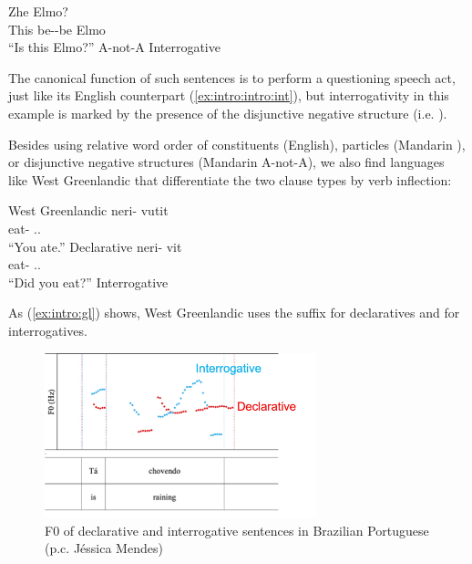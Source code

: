 \gll Zhe  Elmo?\\
This be-\Neg-be Elmo\\
``Is this Elmo?'' \hfill A-not-A Interrogative
\eex

The canonical function of such sentences is to perform a questioning speech act, just like its English counterpart (\ref{ex:intro:intro:int}), but interrogativity in this example is marked by the presence of the disjunctive negative structure (i.e. ). 

Besides using relative word order of constituents (English), particles (Mandarin ), or disjunctive negative structures (Mandarin A-not-A), we also find languages like West Greenlandic that differentiate the two clause types by verb inflection:

West Greenlandic
\bxl
\label{ex:intro:gl:dec}
\gll neri- vutit\\
eat- \Ind.\Ssg.\Pst{}\\
``You ate.'' \hfill Declarative
\ex \label{ex:intro:gl:int}
\gll neri- vit\\
eat- \Int.\Ssg.\Pst{}\\
``Did you eat?'' \hfill Interrogative
\exl
\hspace*{\fill} \cite[18, ex (50)]{konig2007}
\eex

As (\ref{ex:intro:gl}) shows, West Greenlandic uses the suffix  for declaratives and  for interrogatives.

\begin{figure}[H]
    \centering
    \includegraphics[width=0.7\textwidth]{figures/PB.jpg}
    \caption{F0 of declarative and interrogative sentences in Brazilian Portuguese (p.c. J\'essica Mendes)}
    \label{fig:intro:PB}
\end{figure}

